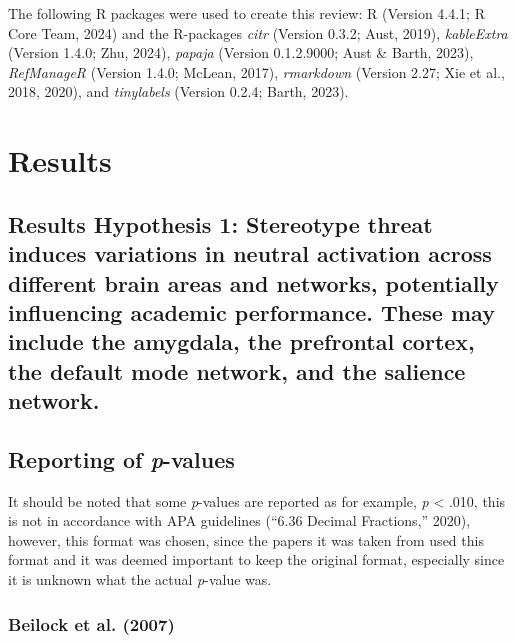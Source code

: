 \documentclass[
  stu,floatsintext]{apa7}
\begin{document}
The following R packages were used to create this review: R (Version 4.4.1; R Core Team, 2024) and the R-packages \emph{citr} (Version 0.3.2; Aust, 2019), \emph{kableExtra} (Version 1.4.0; Zhu, 2024), \emph{papaja} (Version 0.1.2.9000; Aust \& Barth, 2023), \emph{RefManageR} (Version 1.4.0; McLean, 2017), \emph{rmarkdown} (Version 2.27; Xie et al., 2018, 2020), and \emph{tinylabels} (Version 0.2.4; Barth, 2023).

\section{Results}\label{results}

\subsection{Results Hypothesis 1: Stereotype threat induces variations in neutral activation across different brain areas and networks, potentially influencing academic performance. These may include the amygdala, the prefrontal cortex, the default mode network, and the salience network.}\label{results-hypothesis-1-stereotype-threat-induces-variations-in-neutral-activation-across-different-brain-areas-and-networks-potentially-influencing-academic-performance.-these-may-include-the-amygdala-the-prefrontal-cortex-the-default-mode-network-and-the-salience-network.}

\subsection{\texorpdfstring{Reporting of \emph{p}-values}{Reporting of p-values}}\label{reporting-of-p-values}

It should be noted that some \emph{p}-values are reported as for example, \emph{p} \textless{} .010, this is not in accordance with APA guidelines ({``6.36 {Decimal Fractions},''} 2020), however, this format was chosen, since the papers it was taken from used this format and it was deemed important to keep the original format, especially since it is unknown what the actual \emph{p}-value was.

\subsubsection{Beilock et al. (2007)}\label{beilockstereotypethreatworking2007}
\end{document}
